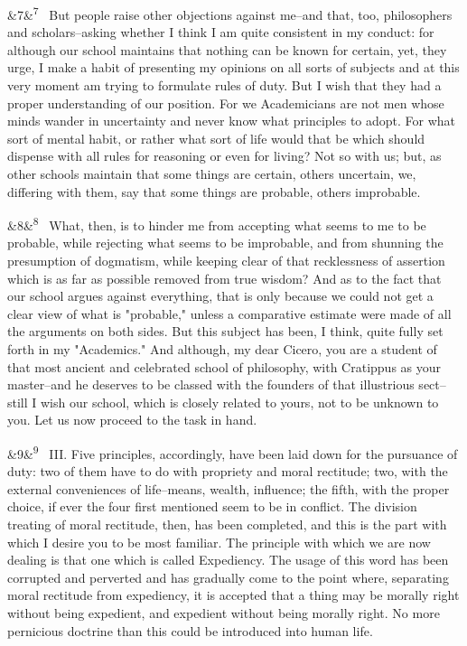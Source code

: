 \documentclass[12pt]{article}
\newcommand{\para}[1][]{\par\noindent\ifx&#1&\else\textsuperscript{\footnotesize #1}~\fi}
\begin{document}
\para[7] But people raise other objections against me--and that, too, philosophers and scholars--asking whether I think I am quite consistent in my conduct: for although our school maintains that nothing can be known for certain, yet, they urge, I make a habit of presenting my opinions on all sorts of subjects and at this very moment am trying to formulate rules of duty. But I wish that they had a proper understanding of our position. For we Academicians are not men whose minds wander in uncertainty and never know what principles to adopt. For what sort of mental habit, or rather what sort of life would that be which should dispense with all rules for reasoning or even for living? Not so with us; but, as other schools maintain that some things are certain, others uncertain, we, differing with them, say that some things are probable, others improbable.

\para[8] What, then, is to hinder me from accepting what seems to me to be probable, while rejecting what seems to be improbable, and from shunning the presumption of dogmatism, while keeping clear of that recklessness of assertion which is as far as possible removed from true wisdom? And as to the fact that our school argues against everything, that is only because we could not get a clear view of what is "probable," unless a comparative estimate were made of all the arguments on both sides. But this subject has been, I think, quite fully set forth in my "Academics." And although, my dear Cicero, you are a student of that most ancient and celebrated school of philosophy, with Cratippus as your master--and he deserves to be classed with the founders of that illustrious sect--still I wish our school, which is closely related to yours, not to be unknown to you. Let us now proceed to the task in hand.

\para[9] III. Five principles, accordingly, have been laid down for the pursuance of duty: two of them have to do with propriety and moral rectitude; two, with the external conveniences of life--means, wealth, influence; the fifth, with the proper choice, if ever the four first mentioned seem to be in conflict. The division treating of moral rectitude, then, has been completed, and this is the part with which I desire you to be most familiar. The principle with which we are now dealing is that one which is called Expediency. The usage of this word has been corrupted and perverted and has gradually come to the point where, separating moral rectitude from expediency, it is accepted that a thing may be morally right without being expedient, and expedient without being morally right. No more pernicious doctrine than this could be introduced into human life.
\end{document}
